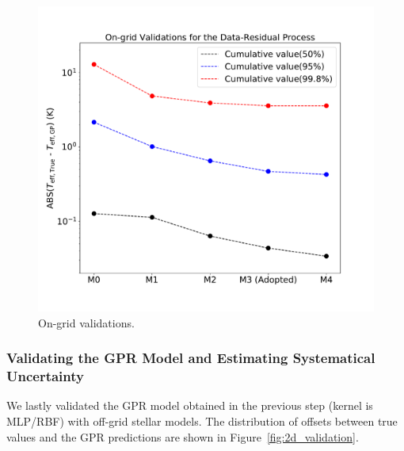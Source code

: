  \begin{figure}
	\includegraphics[width=1.0\columnwidth]{all_validations.pdf}
    \caption{On-grid validations.}  
    \label{fig:on-grid_validation}
\end{figure}

\subsubsection{Validating the GPR Model and Estimating Systematical Uncertainty}

We lastly validated the GPR model obtained in the previous step (kernel is MLP/RBF) with off-grid stellar models. The distribution of offsets between true values and the GPR predictions are shown in Figure~\ref{fig:2d_validation}. 
 
